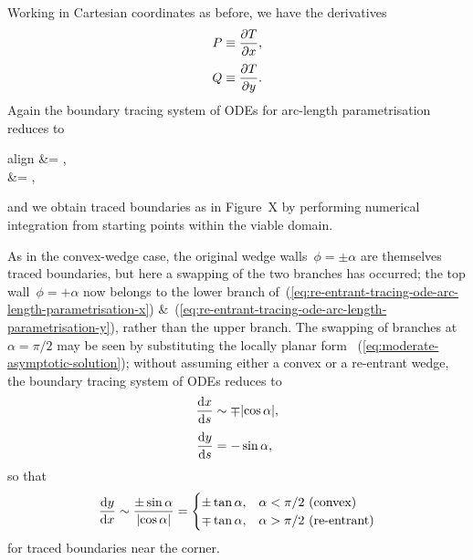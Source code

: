 Working in Cartesian coordinates as before,
we have the derivatives
\begin{align}
  P &\ideq \pder{T}{x},
    \label{eq:re-entrant-gradient-x-component} \\[\tallspace]
  Q &\ideq \pder{T}{y}.
    \label{eq:re-entrant-gradient-y-component}
\end{align}
Again the boundary tracing system of ODEs for arc-length parametrisation
reduces to
\begin{important}{align}
   &= ,
    \label{eq:re-entrant-tracing-ode-arc-length-parametrisation-x}
    \\[\tallspace]
   &= ,
    \label{eq:re-entrant-tracing-ode-arc-length-parametrisation-y}
\end{important}
and we obtain traced boundaries
as in Figure~X %
by performing numerical integration
from starting points within the viable domain.

As in the convex-wedge case,
the original wedge walls~$\phi = \pm\alpha$
are themselves traced boundaries,
but here a swapping of the two branches has occurred;
the top wall~$\phi = +\alpha$ now belongs to the lower branch
of~(\ref{eq:re-entrant-tracing-ode-arc-length-parametrisation-x})
\&~(\ref{eq:re-entrant-tracing-ode-arc-length-parametrisation-y}),
rather than the upper branch.
The swapping of branches at~$\alpha = \pi/2$ may be seen
by substituting the locally planar form~%
  (\ref{eq:moderate-asymptotic-solution});
without assuming either a convex or a re-entrant wedge,
the boundary tracing system of ODEs reduces to
\begin{align}
  \tder{x}{s} &\asy \mp \abs{\cos\alpha},
    \label{eq:planar-asymptotic-tracing-ode-arc-length-parametrisation-x}
    \\[\tallspace]
  \tder{y}{s} &= -\sin\alpha,
    \label{eq:planar-asymptotic-tracing-ode-arc-length-parametrisation-y}
\end{align}
so that
\begin{equation}
  \tder{y}{x} \asy \frac{\pm\sin\alpha}{\abs{\cos\alpha}} =
    \begin{cases}
      \pm\tan\alpha, &\text{$\alpha < \pi/2$ (convex)} \\
      \mp\tan\alpha, &\text{$\alpha > \pi/2$ (re-entrant)}
    \end{cases}
  \label{eq:planar-asymptotic-tracing-ode-coordinate-parametrisation-y}
\end{equation}
for traced boundaries near the corner.

